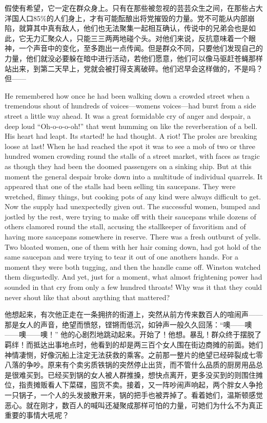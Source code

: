 \begin{paracol}{2}
\switchcolumn

假使有希望，它一定在群众身上。只有在那些被忽视的芸芸众生之间，在那些占大洋国人口85\%的人们身上，才有可能酝酿出将党摧毁的力量。党不可能从内部崩陷，就算其中真有敌人，他们也无法聚集一起相互确认，传说中的兄弟会也是如此，它无力汇聚众人，只能三三两两地碰个头。对他们来说，反抗意味着一个眼神，一个声音中的变化，至多跑出一点传闻。但是群众不同，只要他们发现自己的力量，他们就没必要躲在暗中进行活动，若他们愿意，他们可以像马驱赶苍蝇那样站出来，到第二天早上，党就会被打得支离破碎。他们迟早会这样做的，不是吗？但——

\switchcolumn*

He remembered how once he had been walking down a crowded street when a
tremendous shout of hundreds of voices---women\textquotesingle s
voices---had burst from a side street a little way ahead. It was a great
formidable cry of anger and despair, a deep loud ``Oh-o-o-o-oh!'' that
went humming on like the reverberation of a bell. His heart had leapt.
It\textquotesingle s started! he had thought. A riot! The proles are
breaking loose at last! When he had reached the spot it was to see a mob
of two or three hundred women crowding round the stalls of a street
market, with faces as tragic as though they had been the doomed
passengers on a sinking ship. But at this moment the general despair
broke down into a multitude of individual quarrels. It appeared that one
of the stalls had been selling tin saucepans. They were wretched, flimsy
things, but cooking pots of any kind were always difficult to get. Now
the supply had unexpectedly given out. The successful women, bumped and
jostled by the rest, were trying to make off with their saucepans while
dozens of others clamored round the stall, accusing the stallkeeper of
favoritism and of having more saucepans somewhere in reserve. There was
a fresh outburst of yells. Two bloated women, one of them with her hair
coming down, had got hold of the same saucepan and were trying to tear
it out of one another\textquotesingle s hands. For a moment they were
both tugging, and then the handle came off. Winston watched them
disgustedly. And yet, just for a moment, what almost frightening power
had sounded in that cry from only a few hundred throats! Why was it that
they could never shout like that about anything that mattered?

\switchcolumn

他想起来，有次他正走在一条拥挤的街道上，突然从前方传来数百人的喧闹声——那是女人的声音，绝望而愤怒，铿锵而低沉，如钟声一般久久回荡：``噢——噢——噢——噢！''
他的心剧烈地跳动起来。开始了！他想。暴乱！群众终于摆脱了羁绊！而抵达出事地点时，他看到的却是两三百个女人围在街边商摊的前面。她们神情凄恻，好像沉船上注定无法获救的乘客。之前那一整片的绝望已经碎裂成七零八落的争吵。原来有个卖劣质铁锅的突然停止出货，而不管什么品质的厨房用品总是很难买到。已经买到锅的女人被人群推搡，想快点离开，更多没买到的则围住摊位，指责摊贩看人下菜碟，囤货不卖。接着，又一阵吵闹声响起，两个胖女人争抢一只锅子，一个人的头发披散开来，锅的把手也被弄掉了。看着她们，温斯顿感觉恶心。就在刚才，数百人的喊叫还凝聚成那样可怕的力量，可她们为什么不为真正重要的事情大吼呢？


\end{paracol}
